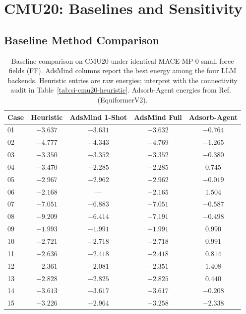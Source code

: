 \documentclass[%
 preprint,
 superscriptaddress,
 amsmath,amssymb,
 aps,
 prb,
 floatfix,
]{revtex4-2}
\begin{document}


\section{CMU20: Baselines and Sensitivity}

\subsection{Baseline Method Comparison}

\begin{table}[ht]
\centering
\caption{Baseline comparison on CMU20 under identical MACE-MP-0 small force fields (FF). AdsMind columns report the best energy among the four LLM backends. Heuristic entries are raw energies; interpret with the connectivity audit in Table~\ref{tab:si-cmu20-heuristic}. Adsorb-Agent energies from Ref.~ (EquiformerV2).}
\label{tab:si-cmu20-baselines}
\begin{tabular}{lcccc}
\toprule
Case & Heuristic & AdsMind 1-Shot & AdsMind Full & Adsorb-Agent \\
\midrule
01 & $-3.637$ & $-3.631$ & $-3.632$ & $-0.764$ \\
02 & $-4.777$ & $-4.343$ & $-4.769$ & $-1.265$ \\
03 & $-3.350$ & $-3.352$ & $-3.352$ & $-0.380$ \\
04 & $-3.470$ & $-2.285$ & $-2.285$ & $0.745$ \\
05 & $-2.967$ & $-2.962$ & $-2.962$ & $-0.019$ \\
06 & $-2.168$ & --- & $-2.165$ & $1.504$ \\
07 & $-7.051$ & $-6.883$ & $-7.051$ & $-0.587$ \\
08 & $-9.209$ & $-6.414$ & $-7.191$ & $-0.498$ \\
09 & $-1.993$ & $-1.991$ & $-1.991$ & $0.990$ \\
10 & $-2.721$ & $-2.718$ & $-2.718$ & $0.991$ \\
11 & $-2.636$ & $-2.418$ & $-2.418$ & $0.814$ \\
12 & $-2.361$ & $-2.081$ & $-2.351$ & $1.408$ \\
13 & $-2.828$ & $-2.825$ & $-2.825$ & $0.440$ \\
14 & $-3.613$ & $-3.617$ & $-3.617$ & $-0.208$ \\
15 & $-3.226$ & $-2.964$ & $-3.258$ & $-2.338$ \\

\end{tabular}
\end{table}
\end{document}
